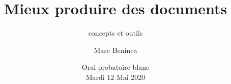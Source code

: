 
\usepackage{fontspec}
\setmainfont{DejaVu Sans}\setmonofont{DejaVu Sans Mono}

\usepackage{multicol}

\usepackage{listings}

\hypersetup{colorlinks,urlcolor=blue}

\def\hititle{Mieux produire des documents}
\def\lotitle{concepts et outils}
\def\bititle{\hititle, \lotitle}

\title[\hititle]{\hititle}
\subtitle{\lotitle}
\author[M. Beninca]{Marc Beninca}
\date[Blanc 2020]{Oral probatoire blanc\\Mardi 12 Mai 2020}
